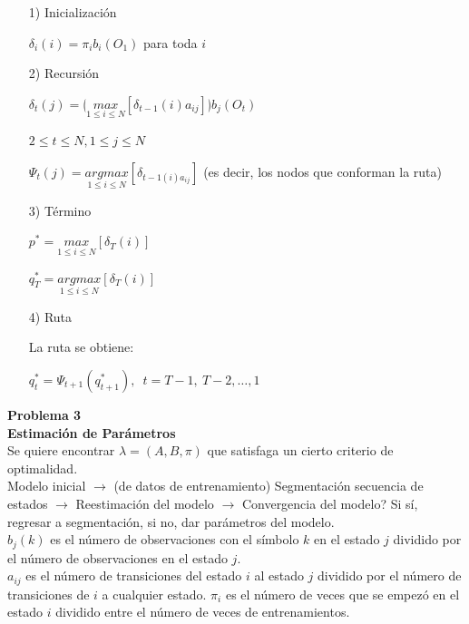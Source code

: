 \begin{enumerate}
	\item [1)] Inicialización
	
	$\delta_i (i) = \pi_i b_i (O_1)$ para  toda $i$
	
	\item[2)]Recursión
	
	$\delta_t (j) = \lgroup \underset{1\leq i\leq N}{max} \left [ \delta_{t-1} (i) a_{ij }\right] \rgroup b_j (O_t)$
	
	$ 2\leq t \leq N , 1 \leq j \leq N$
	
	$\Psi_t (j) = \underset{1\leq i\leq N}{arg max} \left [ \delta_{t-1 (i) a_{ij}}\right] $ (es decir, los nodos que conforman la ruta)
	
	\item[3)]Término
	
	$p^* = \underset{1\leq i\leq N}{max} \left[ \delta_T (i) \right]$
	
	$q_{{T}}^* = \underset{1\leq i\leq N}{arg max} \left[ \delta_T (i) \right]$
	
	
	\item[4)]Ruta
	
	
	La ruta se obtiene:
	
	$q_{t}^* = \Psi_{t+1} (q_{t+1}^*), \enspace t = T-1, \: T-2, \ldots, 1 
	$
	
\end{enumerate}

\begin{caja}
	\textbf{Problema 3}
	\\
	\textbf{Estimación de Parámetros} 
	\\
	
	
	Se quiere encontrar $\lambda = (A,B,\pi) $ que satisfaga un cierto criterio de optimalidad. \\
		
	Modelo inicial $\rightarrow$ (de datos de entrenamiento) Segmentación secuencia de estados $\rightarrow$  Reestimación del
	modelo $\rightarrow$ Convergencia del modelo? Si sí, regresar a segmentación, si no, dar parámetros del modelo. \\
	
	$b_j (k)$ es el número de observaciones con el símbolo $k$ en el estado $j$ dividido por el número de
	observaciones en el estado $j$. \\
	
	
	
	$a_{ij}$ es el número de transiciones del estado $i$ al estado $j$ dividido por el número de transiciones de $i$ a cualquier
	estado.
	$\pi_i$ es el número de veces que se empezó en el estado $i$ dividido entre el número de veces de entrenamientos.
\end{caja}




